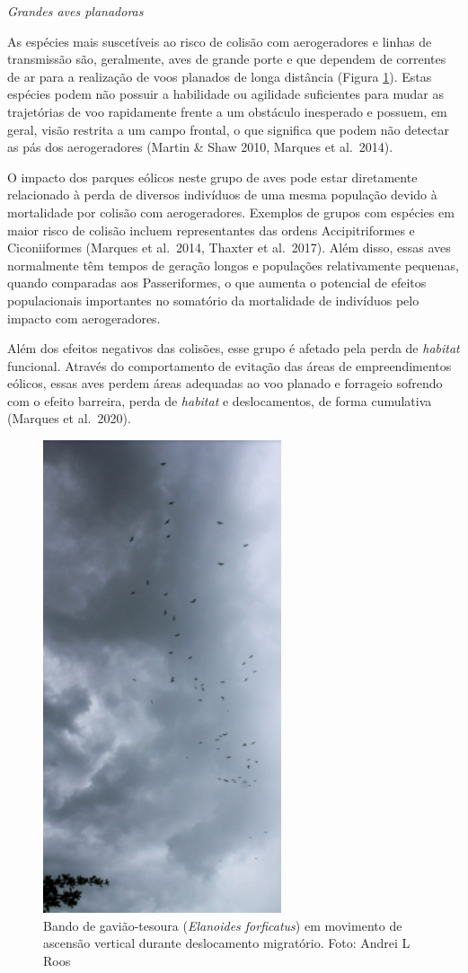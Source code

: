 \documentclass[
  oneside]{scrbook}
\begin{document}
\emph{Grandes aves planadoras}

As espécies mais suscetíveis ao risco de colisão com aerogeradores e linhas de transmissão são, geralmente, aves de grande porte e que dependem de correntes de ar para a realização de voos planados de longa distância (Figura \ref{fig:14}). Estas espécies podem não possuir a habilidade ou agilidade suficientes para mudar as trajetórias de voo rapidamente frente a um obstáculo inesperado e possuem, em geral, visão restrita a um campo frontal, o que significa que podem não detectar as pás dos aerogeradores (Martin \& Shaw 2010, Marques et al.~2014).

O impacto dos parques eólicos neste grupo de aves pode estar diretamente relacionado à perda de diversos indivíduos de uma mesma população devido à mortalidade por colisão com aerogeradores. Exemplos de grupos com espécies em maior risco de colisão incluem representantes das ordens Accipitriformes e Ciconiiformes (Marques et al.~2014, Thaxter et al.~2017). Além disso, essas aves normalmente têm tempos de geração longos e populações relativamente pequenas, quando comparadas aos Passeriformes, o que aumenta o potencial de efeitos populacionais importantes no somatório da mortalidade de indivíduos pelo impacto com aerogeradores.

Além dos efeitos negativos das colisões, esse grupo é afetado pela perda de \emph{habitat} funcional. Através do comportamento de evitação das áreas de empreendimentos eólicos, essas aves perdem áreas adequadas ao voo planado e forrageio sofrendo com o efeito barreira, perda de \emph{habitat} e deslocamentos, de forma cumulativa (Marques et al.~2020).

\begin{figure}[H]

{\centering \includegraphics[width=0.4\linewidth]{imagens/cap04/Figura_4.3} 

}

\caption{Bando de gavião-tesoura (\emph{Elanoides forficatus}) em movimento de ascensão vertical durante deslocamento migratório. Foto: Andrei L Roos}\label{fig:14}
\end{figure}
\end{document}
